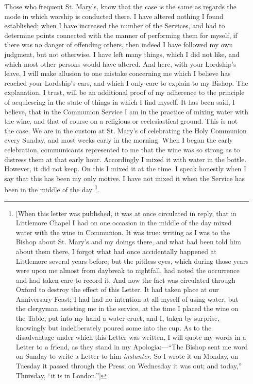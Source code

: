 Those who frequent St. Mary's, know that the case
is the same as regards the mode in which worship is conducted there. I
have altered nothing I found established; when I have increased the
number of the Services, and had to determine points connected with the
manner of performing them for myself, if there was no danger of
offending others, then indeed I have followed my own judgment, but not
otherwise. I have left many things, which I did not like, and which
most other persons would have altered. And here, with your Lordship's
leave, I will make allusion to one mistake concerning me which I
believe has reached your Lordship's ears, and which I only care to
explain to my Bishop. The explanation, I trust, will be an additional
proof of my adherence to the principle of acquiescing in the state of
things in which I find myself. It has been said, I believe, that in
the Communion Service I am in the practice of mixing water with the
wine, and that of course on a religious or ecclesiastical ground. This
is not the case. We are in the custom at St. Mary's of celebrating the
Holy Communion every Sunday, and most weeks early in the morning. When
I began the early celebration, communicants represented to me that the
wine was so strong as to distress them at that early hour. Accordingly
I mixed it with water in the bottle. However, it did not keep. On this
I mixed it at the time. I speak honestly when I say that this has been
my only motive. I have not mixed it when the Service has been in the
middle of the day \footnote{[When this letter was published, it was at once circulated in reply,
that in Littlemore Chapel I had on one occasion in the middle of the
day mixed water with the wine in Communion. It was true: writing as I
was to the Bishop about St. Mary's and my doings there, and what had
been told him about them there, I forgot what had once accidentally
happened at Littlemore several years before; but the pitiless eyes,
which during those years were upon me almost from daybreak to
nightfall, had noted the occurrence and had taken care to record it.
And now the fact was circulated through Oxford to destroy the effect
of this Letter. It had taken place at our Anniversary Feast; I had had
no intention at all myself of using water, but the clergyman assisting
me in the service, at the time I placed the wine on the Table, put
into my hand a water-cruet, and I, taken by surprise, knowingly but
indeliberately poured some into the cup. As to the disadvantage under
which this Letter was written, I will quote my words in a Letter to a
friend, as they stand in my Apologia:—``The Bishop sent me word on
Sunday to write a Letter to him \emph{instanter}. So I wrote it on
Monday, on Tuesday it passed through the Press; on Wednesday it was
out; and today,'' Thursday, ``it is in London.'']}.


